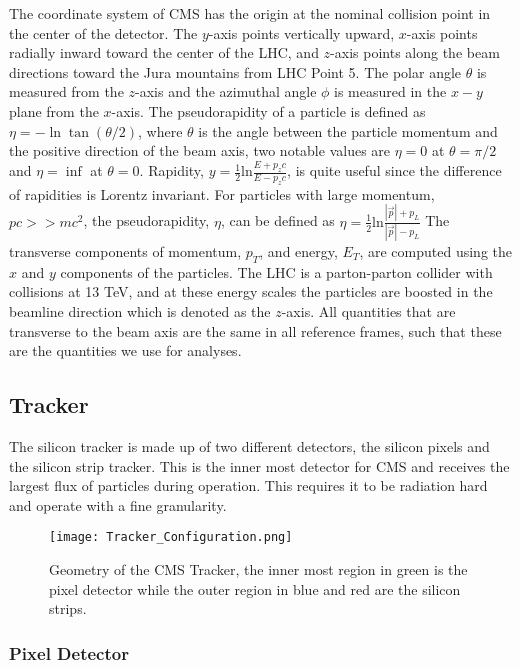 The coordinate system of CMS has the origin at the nominal collision point in the center of the detector. The $y$-axis points vertically upward, $x$-axis points radially inward toward the center of the LHC, and $z$-axis points along the beam directions toward the Jura mountains from LHC Point 5. The polar angle $\theta$ is measured from the $z$-axis and the azimuthal angle $\phi$ is measured in the $x-y$ plane from the $x$-axis. The pseudorapidity of a particle is defined as $\eta=-\ln\tan(\theta/2)$, where $\theta$ is the angle between the particle momentum and the positive direction of the beam axis, two notable values are $\eta=0$ at $\theta=\pi/2$ and $\eta=\inf$ at $\theta=0$. Rapidity, $y=\frac{1}{2}\text{ln}\frac{E+p_z c}{E-p_z c}$, is quite useful since the difference of rapidities is Lorentz invariant. For particles with large momentum, $pc>>mc^2$, the pseudorapidity, $\eta$, can be defined as $\eta=\frac{1}{2}\text{ln}\frac{|\overrightarrow{p}|+p_L}{|\overrightarrow{p}|-p_L}$ The transverse components of momentum, $p_T$, and energy, $E_T$, are computed using the $x$ and $y$ components of the particles. The LHC is a parton-parton collider with collisions at 13 TeV, and at these energy scales the particles are boosted in the beamline direction which is denoted as the $z$-axis. All quantities that are transverse to the beam axis are the same in all reference frames, such that these are the quantities we use for analyses. 

\subsection{Tracker}
\label{sec:Tracker}

The silicon tracker is made up of two different detectors, the silicon pixels and the silicon strip tracker. This is the inner most detector for CMS and receives the largest flux of particles during operation. This requires it to be radiation hard and operate with a fine granularity. 

\begin{figure}
 	\centering
	\texttt{[image: Tracker\_Configuration.png]}
 	\caption[CMS Tracker Geometry]{Geometry of the CMS Tracker, the inner most region in green is the pixel detector while the outer region in blue and red are the silicon strips.}
 	\label{CMSTracker} 
\end{figure}

\subsubsection{Pixel Detector}
\label{subsec:Pixel}

